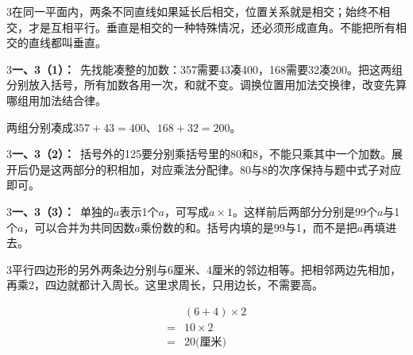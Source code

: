 \documentclass[multi=snippet,border={5bp 20bp 5bp 5bp}]{standalone}
\newenvironment{snippet}[3]{\begin{minipage}{#1bp}\color{answerred}\fontsize{#2}{#3}\selectfont\raggedright}{\end{minipage}}
\begin{document}
\begin{snippet}{505}{11.5}{14}\begin{multicols}{3}\raggedcolumns 在同一平面内，两条不同直线如果延长后相交，位置关系就是相交；始终不相交，才是互相平行。垂直是相交的一种特殊情况，还必须形成直角。不能把所有相交的直线都叫垂直。\end{multicols}\end{snippet}
\begin{snippet}{505}{11.5}{14}\begin{multicols}{3}\raggedcolumns \textbf{一、3（1）：}\ 先找能凑整的加数：357需要43凑400，168需要32凑200。把这两组分别放入括号，所有加数各用一次，和就不变。调换位置用加法交换律，改变先算哪组用加法结合律。\par 两组分别凑成\(357+43=400\)\allowbreak 、\(168+32=200\)\allowbreak 。\end{multicols}\end{snippet}
\begin{snippet}{505}{11.5}{14}\begin{multicols}{3}\raggedcolumns \textbf{一、3（2）：}\ 括号外的125要分别乘括号里的80和8，不能只乘其中一个加数。展开后仍是这两部分的积相加，对应乘法分配律。80与8的次序保持与题中式子对应即可。\end{multicols}\end{snippet}
\begin{snippet}{505}{11.5}{14}\begin{multicols}{3}\raggedcolumns \textbf{一、3（3）：}\ 单独的\(a\)\allowbreak 表示1个\(a\)\allowbreak ，可写成\(a\times1\)\allowbreak 。这样前后两部分分别是99个\(a\)\allowbreak 与1个\(a\)\allowbreak ，可以合并为共同因数\(a\)\allowbreak 乘份数的和。括号内填的是99与1，而不是把\(a\)\allowbreak 再填进去。\end{multicols}\end{snippet}
\begin{snippet}{505}{11.5}{14}\begin{multicols}{3}\raggedcolumns 平行四边形的另外两条边分别与6厘米、4厘米的邻边相等。把相邻两边先相加，再乘2，四边就都计入周长。这里求周长，只用边长，不需要高。\par \[\begin{aligned}&(6+4)\times2\\={}&10\times2\\={}&20\text{(厘米)}\end{aligned}\]\end{multicols}\end{snippet}
\end{document}
